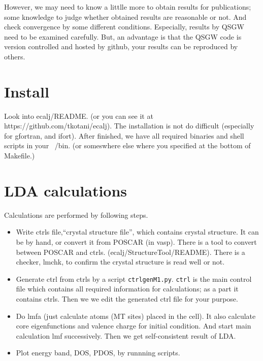 \documentclass[a4paper,10pt,epsf,fleqn]{article}
\begin{document}
However, we may need to know a littlle more to obtain results for publications;
some knowledge to judge whether obtained results 
are reasonable or not. And check convergence by some different conditions.
Especially, results by QSGW need to be examined carefully. 
But, an advantage is that the QSGW code is version controlled and hosted
by github, your results can be reproduced by others.


\section{Install}
\label{install}
Look into ecalj/README. (or you can see it at https://github.com/tkotani/ecalj).
The installation is not do difficult (especially for gfortran, and ifort). 
After finished, we have all required binaries and shell scripts in your
~/bin. (or someswhere else where you specified at the bottom of Makefile.)


\section{LDA calculations}
Calculations are performed by following steps.
\begin{itemize}
\item Write ctrls file,``crystal structure file'', which contains crystal structure.
  It can be by hand, or convert it from POSCAR (in vasp). There
  is a tool to convert between POSCAR and ctrls. (ecalj/StructureTool/README).
  There is a checker, lmchk, to confirm the crystal structure is read well or not.
\item Generate ctrl from ctrls by a script \verb+ctrlgenM1.py+. 
     \verb+ctrl+ is the main control file which contains all required
      information for calculations; as a part it contains ctrls.
      Then we we edit the generated ctrl file for your purpose.
\item Do lmfa (just calculate atoms (MT sites) placed in the cell). 
      It also calculate core eigenfunctions and valence charge for initial
      condition. And start main calculation lmf successively. 
      Then we get self-consistent result of LDA.
\item Plot energy band, DOS, PDOS, by runnning scripts.
\end{itemize}
\end{document}
